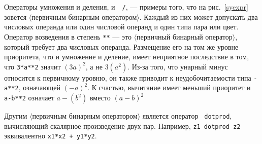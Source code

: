 \documentclass{article} %
\newcommand\invisgap{\nobreak\hskip0pt\relax}
\newcommand\tdescr[1]{$\langle$\invisgap#1\invisgap$\rangle$}
\begin{document}
Операторы умножения и деления, {\tt *}\label{Dmldiv} и~{\tt
/}, --- примеры того, что на рис.~\ref{syexpr} зовется \tdescr{первичным 
бинарным оператором}.
Каждый из них может допускать два числовых операнда или один числовой 
операнд и один типа пара или цвет.
Оператор возведения в степень \verb|**|\label{Dpow} 
--- это \tdescr{первичный бинарный оператор}, который требует два числовых операнда.
Размещение его на том же уровне приоритета, что и умножение и деление, имеет 
неприятное последствие в том, что \verb|3*a**2| значит $(3a)^2$, а не 
$3(a^2)$.
Из-за того, что унарный минус\label{Dneg} относится к первичному уровню, он также 
приводит к неудобочитаемости типа \verb|-a**2|, означающей $(-a)^2$.
К счастью, вычитание имеет меньший приоритет и \verb|a-b**2| 
означает $a-(b^2)$ вместо $(a-b)^2$

Другим \tdescr{первичным бинарным оператором} является оператор {\tt
dotprod}\label{Ddprod}, вычисляющий 
скалярное произведение двух пар. 
Например, {\tt z1 dotprod z2} эквивалентно {\tt x1*x2 + y1*y2}.
\end{document}
